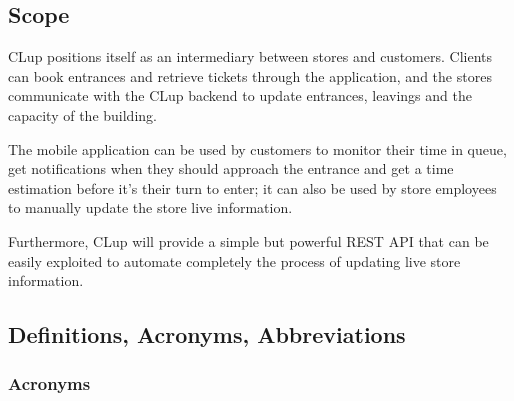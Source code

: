 \subsection{Scope}
CLup positions itself as an intermediary between stores and customers. Clients can book entrances and retrieve tickets through the application, and the stores communicate with the CLup backend to update entrances, leavings and the capacity of the building.

\medskip

The mobile application can be used by customers to monitor their time in queue, get notifications when they should approach the entrance and get a time estimation before it's their turn to enter; it can also be used by store employees to manually update the store live information.

\medskip

Furthermore, CLup will provide a simple but powerful REST API that can be easily exploited to automate completely the process of updating live store information.

\vfill

\pagebreak

\subsection{Definitions, Acronyms, Abbreviations}

\subsubsection{Acronyms}

